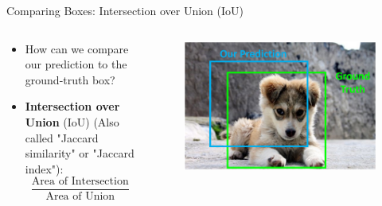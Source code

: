 \begin{frame}{Comparing Boxes: Intersection over Union (IoU)}
\begin{columns}
\begin{column}{0.5\textwidth}
    \begin{itemize}
        \item How can we compare our prediction to the ground-truth box?
        
        \item<2-> \textbf{Intersection over Union} (IoU) (Also called "Jaccard similarity" or "Jaccard index"):
        $$\frac{\text{Area of Intersection}}{\text{Area of Union}}$$
    \end{itemize}
\end{column}

\begin{column}{0.5\textwidth}
    \begin{figure}
    \centering
    \includegraphics[width=1.0\textwidth,height=1.0\textheight,keepaspectratio]{images/obj-det/object_2.png}
    \end{figure}
\end{column}

\end{columns}
    
\end{frame}